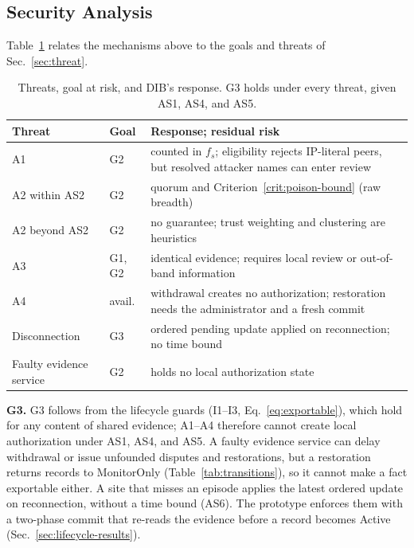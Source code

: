 \documentclass[journal]{IEEEtran}
\theoremstyle{definition}
\begin{document}
\subsection{Security Analysis}
\label{subsec:security-analysis}
Table~\ref{tab:threats} relates the mechanisms above to the goals and threats of Sec.~\ref{sec:threat}.

\begin{table}[t]
\centering
\caption{Threats, goal at risk, and DIB's response. G3 holds under every threat, given AS1, AS4, and AS5.}
\label{tab:threats}
\scriptsize
\begin{tabular}{@{}p{1.45cm}p{0.95cm}p{4.65cm}@{}}
\toprule
Threat & Goal & Response; residual risk \\
\midrule
A1 & G2 & counted in $f_s$; eligibility rejects IP-literal peers, but resolved attacker names can enter review \\
A2 within AS2 & G2 & quorum and Criterion~\ref{crit:poison-bound} (raw breadth) \\
A2 beyond AS2 & G2 & no guarantee; trust weighting and clustering are heuristics \\
A3 & G1, G2 & identical evidence; requires local review or out-of-band information \\
A4 & avail. & withdrawal creates no authorization; restoration needs the administrator and a fresh commit \\
Disconnection & G3 & ordered pending update applied on reconnection; no time bound \\
Faulty evidence service & G2 & holds no local authorization state \\
\bottomrule
\end{tabular}
\end{table}

\textbf{G3.} G3 follows from the lifecycle guards (I1--I3, Eq.~\ref{eq:exportable}), which hold for any content of shared evidence; A1--A4 therefore cannot create local authorization under AS1, AS4, and AS5. A faulty evidence service can delay withdrawal or issue unfounded disputes and restorations, but a restoration returns records to MonitorOnly (Table~\ref{tab:transitions}), so it cannot make a fact exportable either. A site that misses an episode applies the latest ordered update on reconnection, without a time bound (AS6). The prototype enforces them with a two-phase commit that re-reads the evidence before a record becomes Active (Sec.~\ref{sec:lifecycle-results}).
\end{document}
